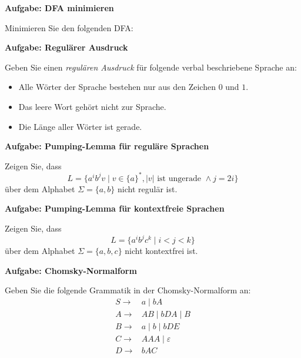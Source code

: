 \documentclass[a4paper,12pt]{article}
\newcommand{\Aufgabe}[1]{
	{
		\vspace*{1cm}
		\textsf{\textbf{Aufgabe: #1}}
		\vspace*{0.2cm}
		
	}
}
\begin{document}
		\Aufgabe{DFA minimieren}
	
	Minimieren Sie den folgenden DFA:\\
	
	
	\Aufgabe{Regulärer Ausdruck}
	
	Geben Sie einen \emph{regulären Ausdruck} für folgende verbal beschriebene Sprache an:
	\begin{itemize}
		\item Alle Wörter der Sprache bestehen nur aus den Zeichen $0$ und $1$.
		\item Das leere Wort gehört nicht zur Sprache.
		\item Die Länge aller Wörter ist gerade.
	\end{itemize}

	\pagebreak
	
	\Aufgabe{Pumping-Lemma für reguläre Sprachen}
	
	Zeigen Sie, dass
	$$L=\{a^ib^jv \mid v \in \{a\}^*, |v| \textrm{ ist ungerade } \land j=2i\}$$
	über dem Alphabet $\Sigma=\{a,b\}$ nicht regulär ist.
	
	\Aufgabe{Pumping-Lemma für kontextfreie Sprachen}
	
	Zeigen Sie, dass
	$$L=\{a^ib^jc^k \mid i<j<k\}$$
	über dem Alphabet $\Sigma=\{a,b,c\}$ nicht kontextfrei ist.
	
	\Aufgabe{Chomsky-Normalform}
	
	Geben Sie die folgende Grammatik in der Chomsky-Normalform an:
	\begin{align*}
		S \rightarrow & a \mid bA\\
		A \rightarrow & AB \mid bDA \mid B\\
		B \rightarrow & a \mid b \mid bDE\\
		C \rightarrow & AAA \mid \varepsilon\\	
		D \rightarrow & bAC	
	\end{align*}
\end{document}
